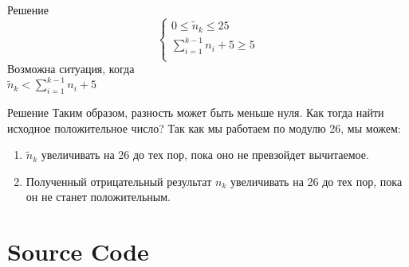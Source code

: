 \documentclass[12pt]{beamer}
\begin{document}
\begin{frame}{Решение}
\centering
\fontsize{15pt}{15pt}\selectfont
    \begin{equation}
        \begin{cases}
            0 \leq \widetilde{n}_{k} \leq 25\\
            \sum\limits_{i=1}^{k-1} n_{i} + 5 \geq 5\\
        \end{cases}
    \end{equation}
    Возможна ситуация, когда\\
    $\widetilde{n}_{k} < \sum\limits_{i=1}^{k-1} n_{i} + 5$
    
    
\end{frame}

\begin{frame}{Решение}
    Таким образом, разность может быть меньше нуля. Как тогда найти исходное положительное число? Так как мы работаем по модулю 26, мы можем:
    \begin{enumerate}
        \item $\widetilde{n}_{k}$ увеличивать на 26 до тех пор, пока оно не превзойдет вычитаемое.
        \item Полученный отрицательный результат ${n}_{k}$ увеличивать на 26 до тех пор, пока он не станет положительным.
    \end{enumerate}
    
    
\end{frame}

\section{Source Code}
\end{document}
